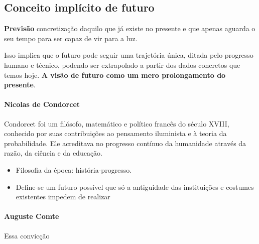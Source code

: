 \subsection*{Conceito implícito de futuro}

\begin{keypoint}
\textbf{Previsão} concretização daquilo que já existe no presente e que apenas aguarda o seu tempo para ser capaz de vir para a luz.
\end{keypoint}

Isso implica que o futuro pode seguir uma trajetória única, ditada pelo progresso humano e técnico, podendo ser extrapolado a partir dos dados concretos que temos hoje. \textbf{A visão de futuro como um mero prolongamento do presente}.

\paragraph{Nicolas de Condorcet}
Condorcet foi um filósofo, matemático e político francês do século XVIII, conhecido por suas contribuições ao pensamento iluminista e à teoria da probabilidade. Ele acreditava no progresso contínuo da humanidade através da razão, da ciência e da educação.
\begin{itemize}
  \item Filosofia da época: história-progresso.
  \item Define-se um futuro possível que só a antiguidade das instituições e costumes existentes impedem de realizar
\end{itemize}


\paragraph{Auguste Comte}
Essa convicção 




\sectionbreak